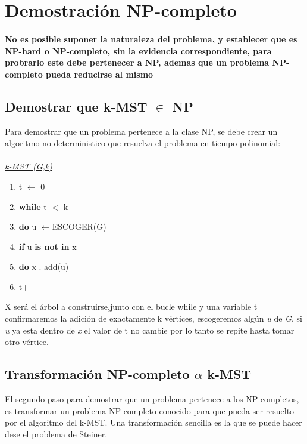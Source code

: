 \documentclass[spanish,12pt]{elsarticle}
\newcommand{\blank}[1]{\hspace*{#1}}
\begin{document}
\section{Demostración NP-completo}
\paragraph{\textnormal{No es posible suponer la naturaleza del problema, y establecer que es NP-hard o NP-completo, sin la evidencia correspondiente, para probrarlo este debe pertenecer a NP, ademas que un problema NP-completo pueda reducirse al mismo}}
\subsection{Demostrar que k-MST $\in$ NP}
Para demostrar que un problema pertenece a la clase NP, se debe crear un algoritmo no deterministico que resuelva el problema en tiempo polinomial:\\\\
\textit{\underline{k-MST (G,k)} }
\begin{enumerate}
    \item  \textnormal{t $\leftarrow$ 0}
    \item  \textnormal{\textbf{while} t $<$ k}
    \item \textnormal{\blank{1cm}\textbf{do} u $\leftarrow${ESCOGER(G)}}
    \item  \textnormal{\blank{2cm}\textbf{if} u \textbf{is not in} x}
    \item \textnormal{\blank{3cm}\textbf{do} x . add(u)}
     \item \textnormal{\blank{3cm} t++}\\
\end{enumerate}
X será el árbol a construirse,junto con el bucle while y una variable t confirmaremos la adición de  exactamente k vértices, escogeremos algún \textit{u} de \textit{G}, si \textit{u} ya esta dentro de \textit{x} el valor de t no cambie por lo tanto se repite hasta tomar otro vértice.

\subsection{Transformación NP-completo $\alpha$  k-MST}
El segundo paso para demostrar que un problema pertenece a los NP-completos, es transformar un problema NP-completo conocido para que pueda ser resuelto por el algoritmo del k-MST. Una transformación sencilla es la que se puede hacer dese el problema de Steiner.
\end{document}

